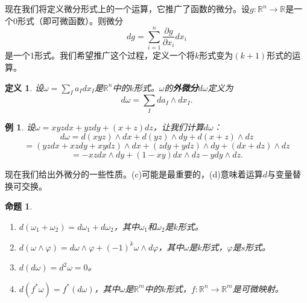 \documentclass[12pt,a4paper]{ctexbook}
\newtheorem{proposition}[theorem]{命题}
\newtheorem{definition}[theorem]{定义}
\newtheorem{example}[theorem]{例}
\begin{document}
现在我们将定义微分形式上的一个运算，它推广了函数的微分。设$g:\mathbb{R}^n\to\mathbb{R}$是一个0形式（即可微函数）。则微分
$$dg = \sum_{i=1}^n \frac{\partial g}{\partial x_i}dx_i$$
是一个1形式。我们希望推广这个过程，定义一个将$k$形式变为$(k+1)$形式的运算。

\begin{definition}
设$\omega = \sum_I a_I dx_I$是$\mathbb{R}^n$中的$k$形式。$\omega$的\textbf{外微分}$d\omega$定义为
$$d\omega = \sum_I da_I\wedge dx_I.$$
\end{definition}

\begin{example}
设$\omega = xyzdx + yzdy + (x+z)dz$，让我们计算$d\omega$：
$$d\omega = d(xyz)\wedge dx + d(yz)\wedge dy + d(x+z)\wedge dz$$
$$= (yzdx + xzdy + xydz)\wedge dx + (zdy + ydz)\wedge dy + (dx + dz)\wedge dz$$
$$= -xzdx\wedge dy + (1-xy)dx\wedge dz - ydy\wedge dz.$$
\end{example}

现在我们给出外微分的一些性质。(c)可能是最重要的，(d)意味着运算$d$与变量替换可交换。

\begin{proposition}
\begin{enumerate}[label=\alph*)]
    \item $d(\omega_1+\omega_2) = d\omega_1 + d\omega_2$，其中$\omega_1$和$\omega_2$是$k$形式。
    \item $d(\omega\wedge\varphi) = d\omega\wedge\varphi + (-1)^k\omega\wedge d\varphi$，其中$\omega$是$k$形式，$\varphi$是$s$形式。
    \item $d(d\omega) = d^2\omega = 0$。
    \item $d(f^*\omega) = f^*(d\omega)$，其中$\omega$是$\mathbb{R}^m$中的$k$形式，$f:\mathbb{R}^n\to\mathbb{R}^m$是可微映射。
\end{enumerate}
\end{proposition}
\end{document}
